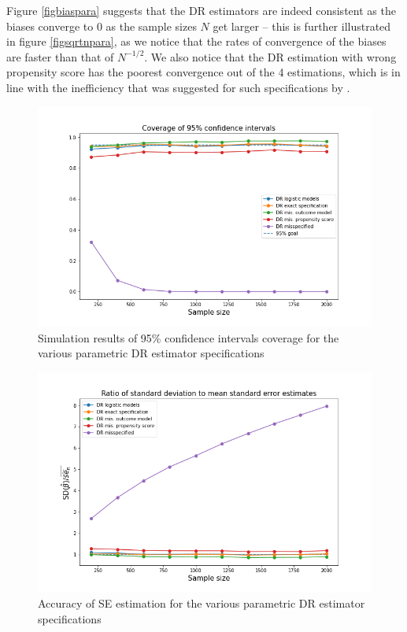 \documentclass[12pt,twoside]{article}
\begin{document}
Figure \ref{figbiaspara} suggests that the DR estimators are indeed consistent as the biases converge to 0 as the sample sizes $N$ get larger -- this is further illustrated in figure \ref{figsqrtnpara}, as we notice that the rates of convergence of the biases are faster than that of $N^{-1/2}$. We also notice that the DR estimation with wrong propensity score has the poorest convergence out of the 4 estimations, which is in line with the inefficiency that was suggested for such specifications by \citet{kang}.

\begin{figure}[h!]
    \centering
    \includegraphics[width = 0.9\columnwidth]{figures/CIpara.png}
    \caption{Simulation results of 95\% confidence intervals coverage for the various parametric DR estimator specifications}
    \label{figCIpara}
\end{figure}

\begin{figure}[h!]
    \centering
    \includegraphics[width = 0.9\columnwidth]{figures/SEpara.png}
    \caption{Accuracy of \citet{lunceford_davidian} SE estimation for the various parametric DR estimator specifications}
    \label{figSEpara}
\end{figure}
\end{document}
